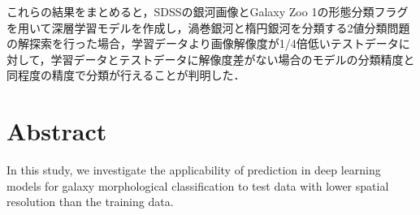 \documentclass[a4j, 11pt]{jreport}
\begin{document}
これらの結果をまとめると，SDSSの銀河画像とGalaxy Zoo 1の形態分類フラグを用いて深層学習モデルを作成し，渦巻銀河と楕円銀河を分類する2値分類問題の解探索を行った場合，学習データより画像解像度が1/4倍低いテストデータに対して，学習データとテストデータに解像度差がない場合のモデルの分類精度と同程度の精度で分類が行えることが判明した．







\chapter*{Abstract}
In this study, we investigate the applicability of prediction in deep learning models for galaxy morphological classification to test data with lower spatial resolution than the training data.
\end{document}

